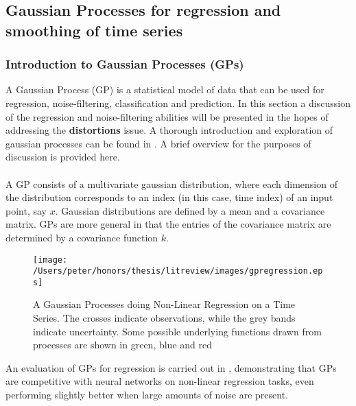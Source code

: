 	\subsection{Gaussian Processes for regression and smoothing of time series}
	\subsubsection{Introduction to Gaussian Processes (GPs)}
	A Gaussian Process (GP) is a statistical model of data that can be used for regression, noise-filtering, classification and prediction. In this section a discussion of the regression and noise-filtering abilities will be presented in the hopes of addressing the \textbf{distortions} issue. A thorough introduction and exploration of gaussian processes can be found in \citep{rasmussen2006gpfml}. A brief overview for the purposes of discussion is provided here.
	
	\paragraph{}
	A GP consists of a multivariate gaussian distribution, where each dimension of the distribution corresponds to an index (in this case, time index) of an input point, say $x$. Gaussian distributions are defined by a mean and a covariance matrix. GPs are more general in that the entries of the covariance matrix are determined by a covariance function $k$. 
	\begin{figure}[ht!]
	\centering
	\texttt{[image: /Users/peter/honors/thesis/litreview/images/gpregression.eps]}
	\label{fig:gaussianprocessregression}
	\caption{A Gaussian Processes doing Non-Linear Regression on a Time Series. The crosses indicate observations, while the grey bands indicate uncertainty. Some possible underlying functions drawn from processes are shown in green, blue and red}
	\end{figure}
		An evaluation of GPs for regression is carried out in \citep{rasmussen1996evaluation}, demonstrating that GPs are competitive with neural networks on non-linear regression tasks, even performing slightly better when large amounts of noise are present.
